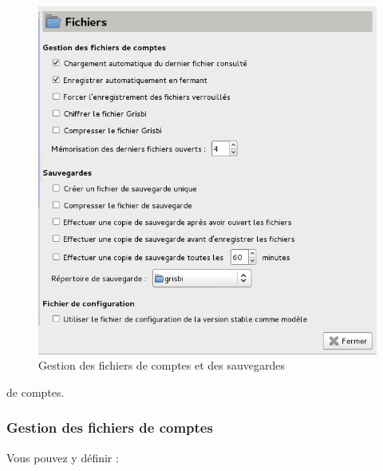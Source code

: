 \begin{figure}[htbp]
\begin{center}
\includegraphics[scale=0.5]{image/screenshot/setup_files}
\end{center}
\caption{Gestion des fichiers de comptes et des sauvegardes}
\label{setup-files-img}
\end{figure}
\else de comptes.
\fi


\subsubsection{Gestion des fichiers de comptes\label{setup-general-files-manage}}

Vous pouvez y définir :

